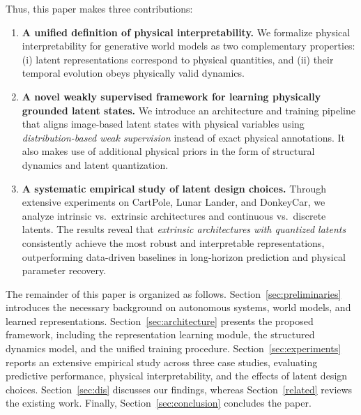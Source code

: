 \documentclass[nonacm,sigconf]{acmart}
\begin{document}
Thus, this paper makes three contributions:
\begin{enumerate}
    \item \textbf{A unified definition of physical interpretability.}
    We formalize physical interpretability for generative world models as two complementary properties:
    (i) latent representations correspond to physical quantities, and
    (ii) their temporal evolution obeys physically valid dynamics.

    \item \textbf{A novel weakly supervised framework for learning physically grounded latent states.}
    We introduce an architecture and training pipeline that aligns image-based latent states with physical variables using \emph{distribution-based weak supervision} instead of exact physical annotations. It also makes use of additional physical priors in the form of structural dynamics and latent quantization. %


    \item \textbf{A systematic empirical study of latent design choices.}
    Through extensive experiments on CartPole, Lunar Lander, and DonkeyCar, we analyze intrinsic vs.\ extrinsic architectures and continuous vs.\ discrete latents. The results reveal that \emph{extrinsic architectures with quantized latents} consistently achieve the most robust and interpretable representations, outperforming data-driven baselines in long-horizon prediction and physical parameter recovery.
\end{enumerate}

The remainder of this paper is organized as follows.
Section~\ref{sec:preliminaries} introduces the necessary background on autonomous systems, world models, and learned representations.
Section~\ref{sec:architecture} presents the proposed framework, including the representation learning module, the structured dynamics model, and the unified training procedure.
Section~\ref{sec:experiments} reports an extensive empirical study across three case studies, evaluating predictive performance, physical interpretability, and the effects of latent design choices. Section~\ref{sec:dis} discusses our findings, whereas Section~\ref{related} reviews the existing work.
Finally, Section~\ref{sec:conclusion} concludes the paper. 
\end{document}

